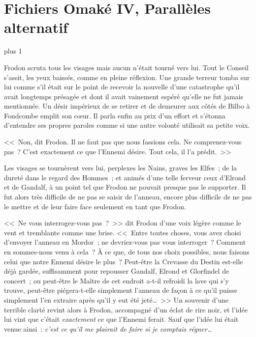 
\makeatletter
\newcommand{\OmakeIVspecialsection}[2][1.5]{%
\vspace*{2\baselineskip plus 1\baselineskip minus 1\baselineskip}%
\noindent\hfill\scalebox{#1}{#2}\hfill\mbox{}%
\vskip 1\baselineskip plus 1\baselineskip%
\@afterindentfalse\@afterheading
}
\makeatother

\newcommand{\OmakeIVsection}[2][1.5]{%
  \OmakeIVspecialsection[#1]{\MakeUppercase{#2}}}

\chapter{Fichiers Omaké IV, Parallèles alternatif}

\OmakeIVspecialsection[1.6]{\fontspec[ExternalLocation]{RingBearer}
\settowidth{\versewidth}{\mbox{Le}}
Seigneur\scalebox{.40}{\parbox[b]{\versewidth}{%
        \centering de\\\nointerlineskip\vskip 4pt la}}Rationalit\raisebox{-.32ex}{É}}

Frodon scruta tous les visages mais aucun n'était tourné vers lui. Tout le Conseil s'assit, les yeux baissés, comme en pleine réflexion. Une grande terreur tomba sur lui comme s'il était sur le point de recevoir la nouvelle d'une catastrophe qu'il avait longtemps présagée et dont il avait vainement espéré qu'elle ne fut jamais mentionnée. Un désir impérieux de se retirer et de demeurer aux côtés de Bilbo à Fondcombe emplit son cœur. Il parla enfin au prix d'un effort et s'étonna d'entendre ses propres paroles comme si une autre volonté utilisait sa petite voix.

<<~Non, dit Frodon. Il ne faut pas que nous fassions cela. Ne comprenez-vous pas~? C'est exactement ce que l'Ennemi désire. Tout cela, il l'a prédit.~>>

Les visages se tournèrent vers lui, perplexes les Nains, graves les Elfes~; de la dureté dans le regard des Hommes~; et animés d'une telle ferveur ceux d'Elrond et de Gandalf, à un point tel que Frodon ne pouvait presque pas le supporter. Il fut alors très difficile de ne pas se saisir de l'anneau, encore plus difficile de ne pas le mettre et de leur faire face seulement en tant que Frodon.

<<~Ne vous interrogez-vous pas~?~>> dit Frodon d'une voix légère comme le vent et tremblante comme une brise. <<~Entre toutes choses, vous avez choisi d'envoyer l'anneau en Mordor~; ne devriez-vous pas vous interroger~? Comment en sommes-nous venu à cela~? À ce que, de tous nos choix possibles, nous faisons celui que notre Ennemi désire le plus~? Peut-être la Crevasse du Destin est-elle déjà gardée, suffisamment pour repousser Gandalf, Elrond et Glorfindel de concert~; ou peut-être le Maître de cet endroit a-t-il refroidi la lave qui s'y trouve, peut-être piégera-t-elle simplement l'anneau de façon à ce qu'il puisse simplement l'en extraire après qu'il y eut été jeté…~>> Un souvenir d'une terrible clarté revint alors à Frodon, accompagné d'un éclat de rire noir, et l'idée lui vint que c'était \emph{exactement} ce que l'Ennemi ferait. Sauf que l'idée lui était venue ainsi~: \emph{c'est ce qu'il me plairait de faire si je comptais régner…}

